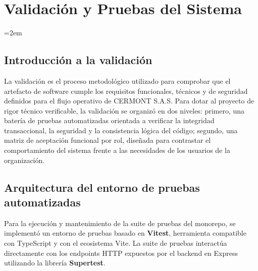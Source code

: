 
\chapter{Validación y Pruebas del Sistema}
\label{ch:validacion-pruebas}

\setlength{\parindent}{0pt}
\setlength{\parskip}{6pt}
\sloppy
\emergencystretch=2em
\raggedbottom

\section{Introducción a la validación}
\label{sec:introduccion-validacion}

La validación es el proceso metodológico utilizado para comprobar que el artefacto de software cumple los requisitos funcionales, técnicos y de seguridad definidos para el flujo operativo de CERMONT S.A.S. Para dotar al proyecto de rigor técnico verificable, la validación se organizó en dos niveles: primero, una batería de pruebas automatizadas orientada a verificar la integridad transaccional, la seguridad y la consistencia lógica del código; segundo, una matriz de aceptación funcional por rol, diseñada para contrastar el comportamiento del sistema frente a las necesidades de los usuarios de la organización.

\section{Arquitectura del entorno de pruebas automatizadas}
\label{sec:arquitectura-pruebas}

Para la ejecución y mantenimiento de la suite de pruebas del monorepo, se implementó un entorno de pruebas basado en \textbf{Vitest}, herramienta compatible con TypeScript y con el ecosistema Vite. La suite de pruebas interactúa directamente con los endpoints HTTP expuestos por el backend en Express utilizando la librería \textbf{Supertest}.

